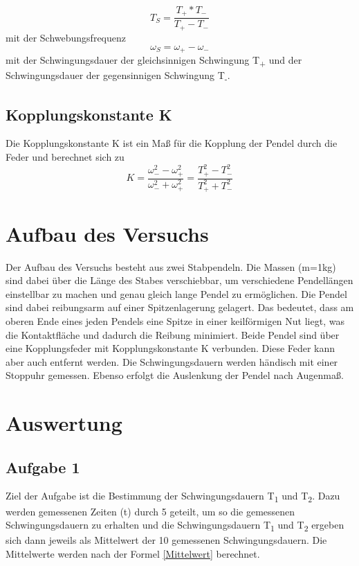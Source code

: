 \documentclass[titlepage=firstcover, captions=tableheading]{scrartcl}
\begin{document}
\begin{equation}\label{TS}
    T_S=\frac{T_+*T_-}{T_+-T_-}
\end{equation}
mit der Schwebungsfrequenz
\begin{displaymath}
    \omega_S=\omega_+-\omega_-
\end{displaymath}
mit der Schwingungsdauer der gleichsinnigen Schwingung T\textsubscript{+} und der Schwingungsdauer der gegensinnigen Schwingung T\textsubscript{-}. \\
\subsection{Kopplungskonstante K}
\noindent Die Kopplungskonstante K ist ein Maß für die Kopplung der Pendel durch die Feder und berechnet sich zu 
\begin{equation}\label{K}
    K=\frac{\omega_-^2-\omega_+^2}{\omega_-^2+\omega_+^2}=\frac{T_+^2-T_-^2}{T_+^2+T_-^2}
\end{equation}

\section{Aufbau des Versuchs}
\noindent Der Aufbau des Versuchs besteht aus zwei Stabpendeln. Die Massen (m=1kg) sind dabei über die Länge des Stabes verschiebbar, um verschiedene Pendellängen einstellbar zu machen und genau gleich lange Pendel zu ermöglichen. Die Pendel sind dabei reibungsarm auf einer Spitzenlagerung gelagert. Das bedeutet, dass am oberen Ende eines jeden Pendels eine Spitze in einer keilförmigen Nut liegt, was die Kontaktfläche und dadurch die Reibung minimiert. Beide Pendel sind über eine Kopplungsfeder mit Kopplungskonstante K verbunden. Diese Feder kann aber auch entfernt werden. Die Schwingungsdauern werden händisch mit einer Stoppuhr gemessen. Ebenso erfolgt die Auslenkung der Pendel nach Augenmaß. 

\section{Auswertung}

\subsection{Aufgabe 1}

Ziel der Aufgabe ist die Bestimmung der Schwingungsdauern T\textsubscript{1} und T\textsubscript{2}.
Dazu werden gemessenen Zeiten (t) durch 5 geteilt, um so die gemessenen Schwingungsdauern zu erhalten und 
die Schwingungsdauern T\textsubscript{1} und T\textsubscript{2} ergeben sich dann jeweils als Mittelwert der 10 gemessenen Schwingungsdauern.
Die Mittelwerte werden nach der Formel \ref{Mittelwert} berechnet.
\end{document}
